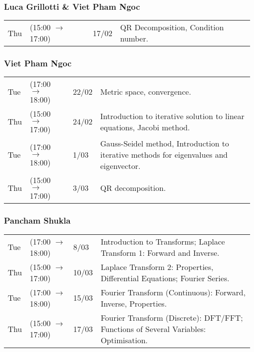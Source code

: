 \documentclass{report}
\begin{document}
            \subsubsection*{Luca Grillotti \& Viet Pham Ngoc}
            \begin{center}
                \begin{tabular}{l l l p{}}
                    Thu & (15:00 $\to$ 17:00) & 17/02 & QR Decomposition, Condition number. \\
                \end{tabular}
            \end{center}
            \subsubsection*{Viet Pham Ngoc}
            \begin{center}
                \begin{tabular}{l l l p{}}
                    Tue & (17:00 $\to$ 18:00) & 22/02 & Metric space, convergence. \\
                    Thu & (15:00 $\to$ 17:00) & 24/02 & Introduction to iterative solution to linear equations, Jacobi method. \\
                    Tue & (17:00 $\to$ 18:00) & 1/03 & Gauss-Seidel method, Introduction to iterative methods for eigenvalues and eigenvector. \\
                    Thu & (15:00 $\to$ 17:00) & 3/03 & QR decomposition. \\
                \end{tabular}
            \end{center}
            \subsubsection*{Pancham Shukla}
            \begin{center}
                \begin{tabular}{l l l p{}}
                    Tue & (17:00 $\to$ 18:00) & 8/03 & Introduction to Transforms; Laplace Transform 1: Forward and Inverse. \\
                    Thu & (15:00 $\to$ 17:00) & 10/03 & Laplace Transform 2: Properties, Differential Equations; Fourier Series. \\
                    Tue & (17:00 $\to$ 18:00) & 15/03 & Fourier Transform (Continuous): Forward, Inverse, Properties. \\
                    Thu & (15:00 $\to$ 17:00) & 17/03 & Fourier Transform (Discrete): DFT/FFT; Functions of Several Variables: Optimisation. \\
                \end{tabular}
            \end{center}
\end{document}
